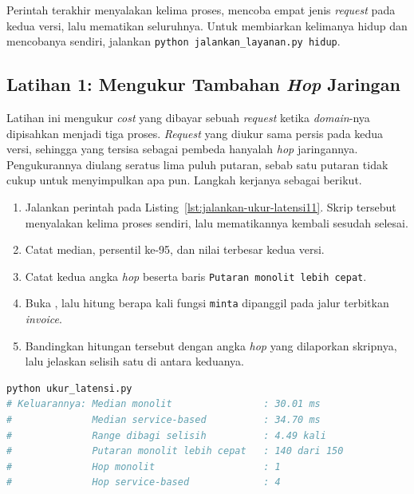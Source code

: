 Perintah terakhir menyalakan kelima proses, mencoba empat jenis \textit{request} pada
kedua versi, lalu mematikan seluruhnya. Untuk membiarkan kelimanya hidup dan
mencobanya sendiri, jalankan \texttt{python jalankan\_layanan.py hidup}.

\subsection*{Latihan 1: Mengukur Tambahan \textit{Hop} Jaringan}

Latihan ini mengukur \textit{cost} yang dibayar sebuah \textit{request} ketika \textit{domain}-nya
dipisahkan menjadi tiga proses. \textit{Request} yang diukur sama persis pada kedua
versi, sehingga yang tersisa sebagai pembeda hanyalah \textit{hop} jaringannya.
Pengukurannya diulang seratus lima puluh putaran, sebab satu putaran tidak
cukup untuk menyimpulkan apa pun. Langkah kerjanya sebagai berikut.

\begin{enumerate}
  \item Jalankan perintah pada Listing~\ref{lst:jalankan-ukur-latensi11}. Skrip
    tersebut menyalakan kelima proses sendiri, lalu mematikannya kembali
    sesudah selesai.
  \item Catat median, persentil ke-95, dan nilai terbesar kedua versi.
  \item Catat kedua angka \textit{hop} beserta baris \texttt{Putaran monolit lebih
    cepat}.
  \item Buka , lalu hitung berapa kali
    fungsi \texttt{minta} dipanggil pada jalur terbitkan \textit{invoice}.
  \item Bandingkan hitungan tersebut dengan angka \textit{hop} yang dilaporkan
    skripnya, lalu jelaskan selisih satu di antara keduanya.
\end{enumerate}

\begin{lstlisting}[language=bash, caption={Mengukur tambahan \textit{hop}
  jaringan, skrip tersedia di \berkas{sources/chapter11/ukur_latensi.py}},
  label=lst:jalankan-ukur-latensi11]
python ukur_latensi.py
# Keluarannya: Median monolit                : 30.01 ms
#              Median service-based          : 34.70 ms
#              Range dibagi selisih          : 4.49 kali
#              Putaran monolit lebih cepat   : 140 dari 150
#              Hop monolit                   : 1
#              Hop service-based             : 4
\end{lstlisting}


